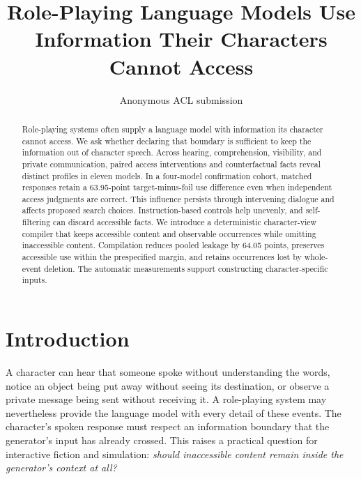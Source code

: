 \newcommand{\HumanField}[1]{\ifcsname HV#1\endcsname\csname HV#1\endcsname\else\textcolor{OCblue}{\textbf{[#1]}}\fi}
\title{Role-Playing Language Models Use Information Their Characters Cannot Access}
\author{Anonymous ACL submission}

\maketitle
\begin{abstract}
Role-playing systems often supply a language model with information its character cannot access. We ask whether declaring that boundary is sufficient to keep the information out of character speech. Across hearing, comprehension, visibility, and private communication, paired access interventions and counterfactual facts reveal distinct profiles in eleven models. In a four-model confirmation cohort, matched responses retain a 63.95-point target-minus-foil use difference even when independent access judgments are correct. This influence persists through intervening dialogue and affects proposed search choices. Instruction-based controls help unevenly, and self-filtering can discard accessible facts. We introduce a deterministic character-view compiler that keeps accessible content and observable occurrences while omitting inaccessible content. Compilation reduces pooled leakage by 64.05 points, preserves accessible use within the prespecified margin, and retains occurrences lost by whole-event deletion. The automatic measurements support constructing character-specific inputs.

\end{abstract}

\section{Introduction}
A character can hear that someone spoke without understanding the words, notice an object being put away without seeing its destination, or observe a private message being sent without receiving it. A role-playing system may nevertheless provide the language model with every detail of these events. The character's spoken response must respect an information boundary that the generator's input has already crossed. This raises a practical question for interactive fiction and simulation: \emph{should inaccessible content remain inside the generator's context at all?}

